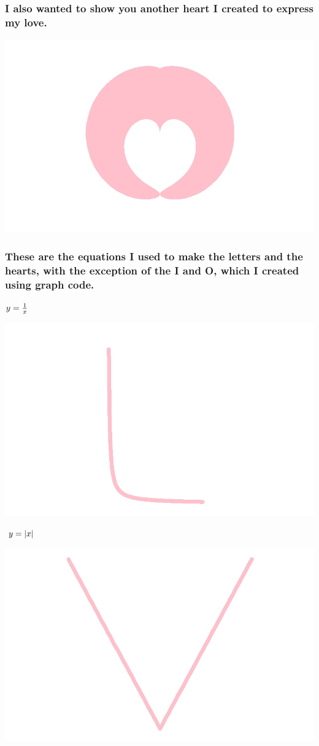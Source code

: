 \documentclass[
]{article}
\begin{document}
\hypertarget{i-also-wanted-to-show-you-another-heart-i-created-to-express-my-love.}{%
\subsubsection{I also wanted to show you another heart I created to
express my
love.}\label{i-also-wanted-to-show-you-another-heart-i-created-to-express-my-love.}}

\begin{center}\includegraphics[width=0.5\linewidth]{Heart1} \end{center}

\hypertarget{these-are-the-equations-i-used-to-make-the-letters-and-the-hearts-with-the-exception-of-the-i-and-o-which-i-created-using-graph-code.}{%
\subsubsection{These are the equations I used to make the letters and
the hearts, with the exception of the I and O, which I created using
graph
code.}\label{these-are-the-equations-i-used-to-make-the-letters-and-the-hearts-with-the-exception-of-the-i-and-o-which-i-created-using-graph-code.}}

\(\LARGE y = \frac{1}{x} \hspace{8cm}\)

\includegraphics[width=0.5\linewidth]{L}

\(\LARGE y=\lvert x\rvert \hspace{8cm}\)

\includegraphics[width=0.5\linewidth]{V}
\end{document}
